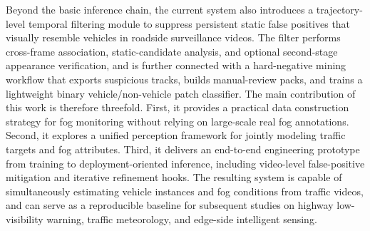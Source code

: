 Beyond the basic inference chain, the current system also introduces a trajectory-level temporal filtering module to suppress persistent static false positives that visually resemble vehicles in roadside surveillance videos. The filter performs cross-frame association, static-candidate analysis, and optional second-stage appearance verification, and is further connected with a hard-negative mining workflow that exports suspicious tracks, builds manual-review packs, and trains a lightweight binary vehicle/non-vehicle patch classifier. The main contribution of this work is therefore threefold. First, it provides a practical data construction strategy for fog monitoring without relying on large-scale real fog annotations. Second, it explores a unified perception framework for jointly modeling traffic targets and fog attributes. Third, it delivers an end-to-end engineering prototype from training to deployment-oriented inference, including video-level false-positive mitigation and iterative refinement hooks. The resulting system is capable of simultaneously estimating vehicle instances and fog conditions from traffic videos, and can serve as a reproducible baseline for subsequent studies on highway low-visibility warning, traffic meteorology, and edge-side intelligent sensing.

